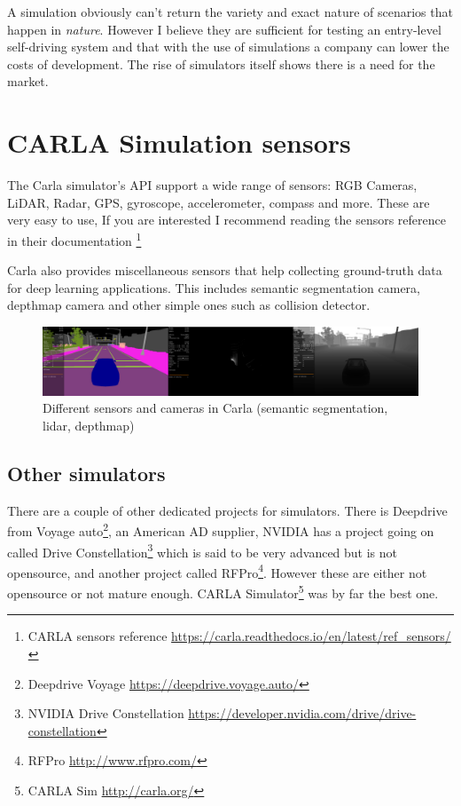 A simulation obviously can't return the variety and exact nature of scenarios
that happen in \emph{nature}. However I believe they are sufficient for testing
an entry-level self-driving system and that with the use of simulations a
company can lower the costs of development. The rise of simulators itself shows
there is a need for the market.

\section{CARLA Simulation sensors}

The Carla simulator's API support a wide range of sensors: RGB Cameras, LiDAR,
Radar, GPS, gyroscope, accelerometer, compass and more. These are very easy to
use, If you are interested I recommend reading the sensors reference in their
documentation \footnote{CARLA sensors reference
\url{https://carla.readthedocs.io/en/latest/ref_sensors/}}

Carla also provides miscellaneous sensors that help collecting ground-truth data
for deep learning applications. This includes semantic segmentation camera,
depthmap camera and other simple ones such as collision detector. 

\begin{figure}[!ht]
  \centering
  \includegraphics[width=150mm, keepaspectratio]{figures/carlaseg.png}
  \caption{Different sensors and cameras in Carla (semantic segmentation, lidar, depthmap)}
  \label{fig:carlaseg}
\end{figure}

\subsection{Other simulators}

There are a couple of other dedicated projects for simulators. There is
Deepdrive from Voyage auto\footnote{Deepdrive Voyage
\url{https://deepdrive.voyage.auto/}}, an American AD supplier, NVIDIA has a
project going on called Drive Constellation\footnote{NVIDIA Drive Constellation
\url{https://developer.nvidia.com/drive/drive-constellation}} which
is said to be very advanced but is not opensource, and another project called
RFPro\footnote{RFPro \url{http://www.rfpro.com/}}. However these are either not
opensource or not mature enough. CARLA Simulator\footnote{CARLA Sim
\url{http://carla.org/}} was by far the best one.